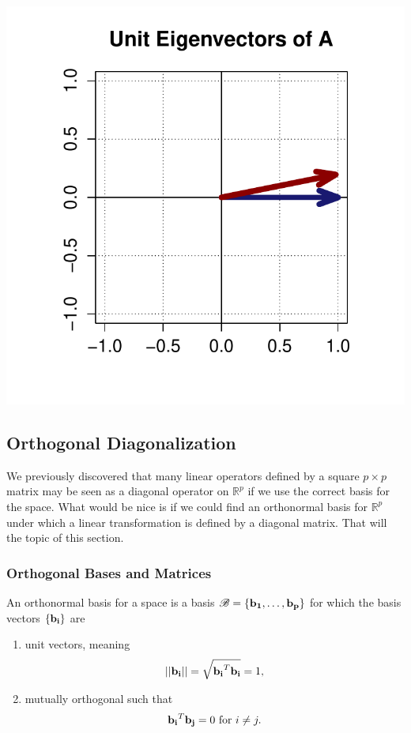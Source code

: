 \documentclass{book}
\begin{document}
{\begin{minipage}{.8\linewidth}
\centering%
\includegraphics[scale=.5]{./Figures/F12.pdf}%
\end{minipage}

}

\subsection{Orthogonal Diagonalization} 

We previously discovered that many linear operators defined by a square $p \times p$ matrix may be seen as a diagonal operator on $\mathbb{R}^p$ if we use the correct basis for the space. What would be nice is if we could find an orthonormal basis for $\mathbb{R}^p$ under which a linear transformation is defined by a diagonal matrix. That will the topic of this section.

\subsubsection{Orthogonal Bases and Matrices} An orthonormal basis for a space is a basis $\mathscr{B}=\{{\bf b_1},\ldots,{\bf b_p}\}$ for which the basis vectors $\{{\bf b_i}\}$ are 
\begin{enumerate}
\item  unit vectors, meaning
$$
||{\bf b_i}||=\sqrt{{\bf b_i}^T{\bf b_i}}=1,
$$

\item mutually orthogonal such that
$$
{\bf b_i}^T{\bf b_j}=0\text{ for }i\neq j.
$$
\end{enumerate}
\end{document}
